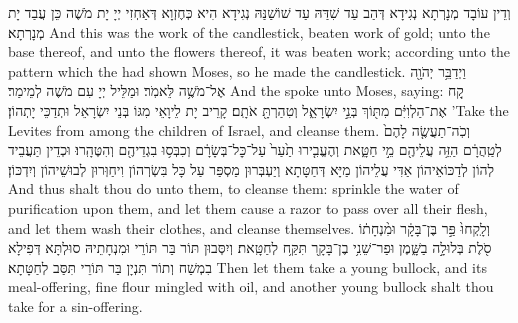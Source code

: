 {וְדֵין עוֹבָד מְנָרְתָא נְגִידָא דְּהַב עַד שִׁדַּהּ עַד שׁוֹשַׁנַּהּ נְגִידָא הִיא כְּחֶזְוָא דְּאַחְזִי יְיָ יָת מֹשֶׁה כֵּן עֲבַד יָת מְנָרְתָא׃}
{And this was the work of the candlestick, beaten work of gold; unto the base thereof, and unto the flowers thereof, it was beaten work; according unto the pattern which the \lord\space had shown Moses, so he made the candlestick.}{}
{וַיְדַבֵּ֥ר יְהֹוָ֖ה אֶל־מֹשֶׁ֥ה לֵּאמֹֽר׃}
{וּמַלֵּיל יְיָ עִם מֹשֶׁה לְמֵימַר׃}
{And the \lord\space spoke unto Moses, saying:}{}
{קַ֚ח אֶת־הַלְוִיִּ֔ם מִתּ֖וֹךְ בְּנֵ֣י יִשְׂרָאֵ֑ל וְטִהַרְתָּ֖ אֹתָֽם׃
}
{קָרֵיב יָת לֵיוָאֵי מִגּוֹ בְּנֵי יִשְׂרָאֵל וּתְדַכֵּי יָתְהוֹן׃}
{’Take the Levites from among the children of Israel, and cleanse them.}{}
{וְכֹֽה־תַעֲשֶׂ֤ה לָהֶם֙ לְטַֽהֲרָ֔ם הַזֵּ֥ה עֲלֵיהֶ֖ם מֵ֣י חַטָּ֑את וְהֶעֱבִ֤ירוּ תַ֙עַר֙ עַל־כׇּל־בְּשָׂרָ֔ם וְכִבְּס֥וּ בִגְדֵיהֶ֖ם וְהִטֶּהָֽרוּ׃
}
{וּכְדֵין תַּעֲבֵיד לְהוֹן לְדַכּוֹאֵיהוֹן אַדִּי עֲלֵיהוֹן מַיָּא דְּחַטָּתָא וְיַעְבְּרוּן מַסְפַּר עַל כָּל בִּשְׂרְהוֹן וִיחַוְּרוּן לְבוּשֵׁיהוֹן וְיִדְכּוֹן׃}
{And thus shalt thou do unto them, to cleanse them: sprinkle the water of purification upon them, and let them cause a razor to pass over all their flesh, and let them wash their clothes, and cleanse themselves.}{}
{וְלָֽקְחוּ֙ פַּ֣ר בֶּן־בָּקָ֔ר וּמִ֨נְחָת֔וֹ סֹ֖לֶת בְּלוּלָ֣ה בַשָּׁ֑מֶן וּפַר־שֵׁנִ֥י בֶן־בָּקָ֖ר תִּקַּ֥ח לְחַטָּֽאת׃
}
{וְיִסְּבוּן תּוֹר בַּר תּוֹרֵי וּמִנְחָתֵיהּ סוּלְתָּא דְּפִילָא בִמְשַׁח וְתוֹר תִּנְיָן בַּר תּוֹרֵי תִּסַּב לְחַטָּתָא׃}
{Then let them take a young bullock, and its meal-offering, fine flour mingled with oil, and another young bullock shalt thou take for a sin-offering.}{}
